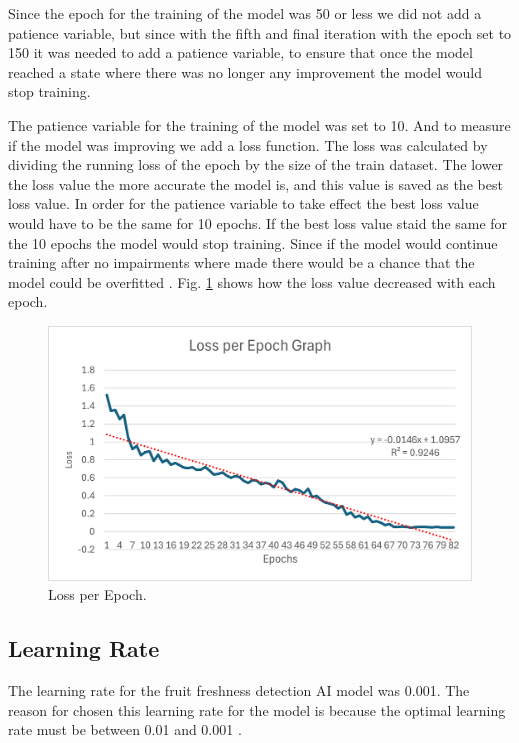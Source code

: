 \documentclass[conference]{IEEEtran}
\begin{document}
Since the epoch for the training of the model was 50 or less we did not add a patience variable, but since with the fifth and final iteration with the epoch set to 150 it was needed to add a patience variable, to ensure that once the model reached a state where there was no longer any improvement the model would stop training.

The patience variable for the training of the model was set to 10. And to measure if the model was improving we add a loss function. The loss was calculated by dividing the running loss of the epoch by the size of the train dataset. The lower the loss value the more accurate the model is, and this value is saved as the best loss value. In order for the patience variable to take effect the best loss value would have to be the same for 10 epochs. If the best loss value staid the same for the 10 epochs the model would stop training. Since if the model would continue training after no impairments where made there would be a chance that the model could be overfitted \cite{b5}. Fig. \ref{fig5} shows how the loss value decreased with each epoch.

\begin{figure}[h]
    \centering
    \includegraphics[width=\linewidth]{Loss_per_Epoch_Graph.png}
    \caption{Loss per Epoch.}
    \label{fig5}
\end{figure}

\subsection{Learning Rate}
The learning rate for the fruit freshness detection AI model was 0.001. The reason for chosen this learning rate for the model is because the optimal learning rate must be between 0.01 and 0.001 \cite{34}.
\end{document}
